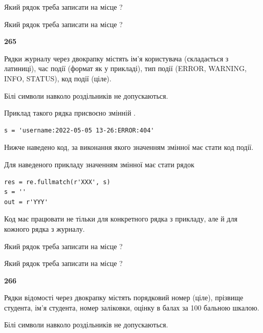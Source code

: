 Який рядок треба записати на місце  ?\par
\vspace{5mm}


Який рядок треба записати на місце  ?\par


\newpage

{\begin {center}\textbf{ 265}\end {center}}\par
Рядки журналу через двокрапку містять ім'я користувача (складається з латиниці), час події (фор\-мат як у прикладі), тип події (ERROR, WARNING, INFO, STATUS), код події (ціле).

Білі символи навколо роздільників не допускаються.

Приклад такого рядка присвоєно змінній .



\begin{verbatim}
s = 'username:2022-05-05 13-26:ERROR:404'
\end{verbatim}


Нижче наведено код, за виконання якого значенням змінної  має стати код події.

Для наведеного прикладу значенням змінної  має стати рядок 



\begin{verbatim}
res = re.fullmatch(r'XXX', s)
s = ''
out = r'YYY'
\end{verbatim}


Код має працювати не тільки для конкретного рядка з прикладу, але й для кожного рядка з журналу.




Який рядок треба записати на місце  ?\par
\vspace{5mm}


Який рядок треба записати на місце  ?\par


\newpage

{\begin {center}\textbf{ 266}\end {center}}\par
Рядки відомості через двокрапку містять порядковий номер (ціле), пріз\-ви\-ще студен\-та, ім'я студента, номер заліковки, оцінку в балах за 100 бальною шкалою.

Білі символи навколо роздільників не допускаються.

